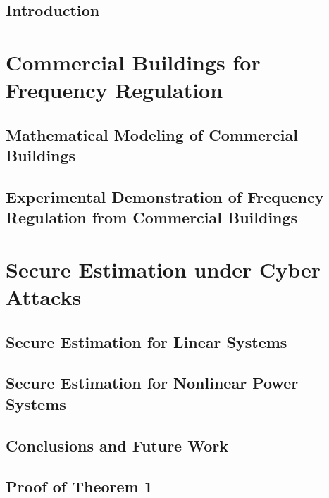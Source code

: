 \documentclass[12pt, oneside, final]{lib/ucthesis}
\def\ssp{\def\baselinestretch{1.0}\large\normalsize}
\begin{document}



\begin{dissertationText}
\chapter{Introduction \label{chapter:intro}}
	
	
\part{Commercial Buildings for Frequency Regulation}\label{part:fr}
\chapter{Mathematical Modeling of Commercial Buildings \label{chapter:building_model}}
	
\chapter{Experimental Demonstration of Frequency Regulation from Commercial Buildings \label{chapter:building_exp}}
	

\part{Secure Estimation under Cyber Attacks}\label{part:se}
\chapter{Secure Estimation for Linear Systems \label{chapter:se_linear}}
	
\chapter{Secure Estimation for Nonlinear Power Systems \label{chapter:se_nonlinear}}
	
	
\chapter{Conclusions and Future Work \label{chapter:conclusions}}
  



\ssp	%




\appendix
\chapter{Proof of Theorem 1 \label{sec:appendix}}
	

\end{dissertationText}
\end{document}

